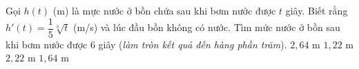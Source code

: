 \begin{ex}%
	Gọi $h(t)$ (m) là mực nước ở bồn chứa sau khi bơm nước được $t$ giây. Biết rằng $h'(t)=\dfrac{1}{5}\sqrt[3]{t}$ (m/s) và lúc đầu bồn không có nước. Tìm mức nước ở bồn sau khi bơm nước được $6$ giây (\textit{làm tròn kết quả đến hàng phần trăm}).
	\choice
	{$2{,}64$ m}
	{$1{,}22$ m}
	{$2{,}22$ m}
	{\True $1{,}64$ m}
\end{ex}


